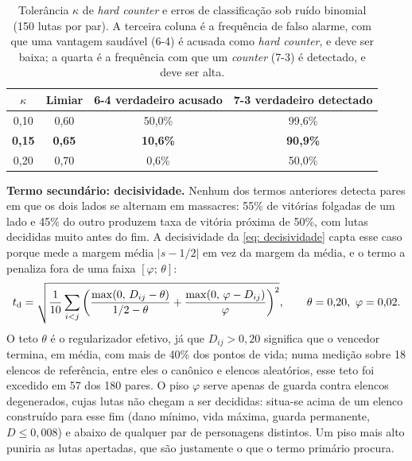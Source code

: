 \begin{table}[htb]
    \caption[Tolerância de \textit{hard counter} e erros de classificação]{Tolerância $\kappa$ de \textit{hard counter} e erros de classificação sob ruído binomial (150 lutas por par). A terceira coluna é a frequência de falso alarme, com que uma vantagem saudável (6-4) é acusada como \textit{hard counter}, e deve ser baixa; a quarta é a frequência com que um \textit{counter} (7-3) é detectado, e deve ser alta.}
    \label{tab: cap}
    \centering
    \small
    \begin{tabular}{c c c c}
        \toprule
        $\kappa$ & \textbf{Limiar} & \textbf{6-4 verdadeiro acusado} & \textbf{7-3 verdadeiro detectado} \\
        \midrule
        0,10 & 0,60 & 50,0\% & 99,6\% \\
        \textbf{0,15} & \textbf{0,65} & \textbf{10,6\%} & \textbf{90,9\%} \\
        0,20 & 0,70 & 0,6\% & 50,0\% \\
        \bottomrule
    \end{tabular}
    \source
\end{table}

\textbf{Termo secundário: decisividade.} Nenhum dos termos anteriores detecta pares em que os dois lados se alternam em massacres: 55\% de vitórias folgadas de um lado e 45\% do outro produzem taxa de vitória próxima de 50\%, com lutas decididas muito antes do fim. A decisividade da \autoref{eq: decisividade} capta esse caso porque mede a margem média $|s - 1/2|$ em vez da margem da média, e o termo a penaliza fora de uma faixa $[\varphi;\, \theta]$:
\begin{equation}
    \label{eq: termo_decis}
    t_{\mathrm{d}} = \sqrt{\frac{1}{10} \sum_{i<j} \left( \frac{\max(0,\, D_{ij} - \theta)}{1/2 - \theta} + \frac{\max(0,\, \varphi - D_{ij})}{\varphi} \right)^2},
    \qquad \theta = 0{,}20,\ \varphi = 0{,}02.
\end{equation}
O teto $\theta$ é o regularizador efetivo, já que $D_{ij} > 0{,}20$ significa que o vencedor termina, em média, com mais de 40\% dos pontos de vida; numa medição sobre 18 elencos de referência, entre eles o canônico e elencos aleatórios, esse teto foi excedido em 57 dos 180 pares. O piso $\varphi$ serve apenas de guarda contra elencos degenerados, cujas lutas não chegam a ser decididas: situa-se acima de um elenco construído para esse fim (dano mínimo, vida máxima, guarda permanente, $D \le 0{,}008$) e abaixo de qualquer par de personagens distintos. Um piso mais alto puniria as lutas apertadas, que são justamente o que o termo primário procura.


